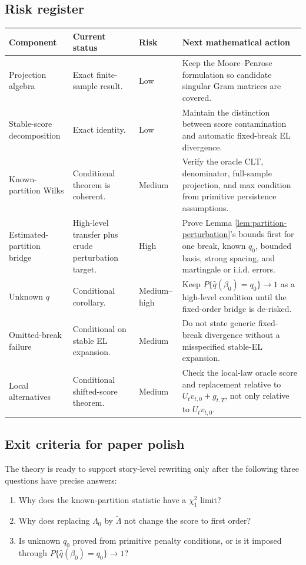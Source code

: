 \documentclass[12pt]{article}
\numberwithin{equation}{section}
\theoremstyle{definition}
\begin{document}
\subsection*{Risk register}

\begin{center}
\begin{tabular}{>{\raggedright\arraybackslash}p{}
                >{\raggedright\arraybackslash}p{}
                >{\raggedright\arraybackslash}p{}
                >{\raggedright\arraybackslash}p{}}
\hline
Component & Current status & Risk & Next mathematical action \\
\hline
Projection algebra & Exact finite-sample result. & Low & Keep the Moore--Penrose formulation so candidate singular Gram matrices are covered. \\
Stable-score decomposition & Exact identity. & Low & Maintain the distinction between score contamination and automatic fixed-break EL divergence. \\
Known-partition Wilks & Conditional theorem is coherent. & Medium & Verify the oracle CLT, denominator, full-sample projection, and max condition from primitive persistence assumptions. \\
Estimated-partition bridge & High-level transfer plus crude perturbation target. & High & Prove Lemma \ref{lem:partition-perturbation}'s bounds first for one break, known \(q_0\), bounded basis, strong spacing, and martingale or i.i.d. errors. \\
Unknown \(q\) & Conditional corollary. & Medium--high & Keep \(P\{\widehat q(\beta_0)=q_0\}\to1\) as a high-level condition until the fixed-order bridge is de-risked. \\
Omitted-break failure & Conditional on stable EL expansion. & Medium & Do not state generic fixed-break divergence without a misspecified stable-EL expansion. \\
Local alternatives & Conditional shifted-score theorem. & Medium & Check the local-law oracle score and replacement relative to \(U_tv_{t,0}+g_{t,T}\), not only relative to \(U_tv_{t,0}\). \\
\hline
\end{tabular}
\end{center}

\subsection*{Exit criteria for paper polish}

The theory is ready to support story-level rewriting only after the following three questions have precise answers:
\begin{enumerate}
    \item Why does the known-partition statistic have a \(\chi^2_1\) limit?
    \item Why does replacing \(\Lambda_0\) by \(\widetilde\Lambda\) not change the score to first order?
    \item Is unknown \(q_0\) proved from primitive penalty conditions, or is it imposed through \(P\{\widehat q(\beta_0)=q_0\}\to1\)?
\end{enumerate}
\end{document}

